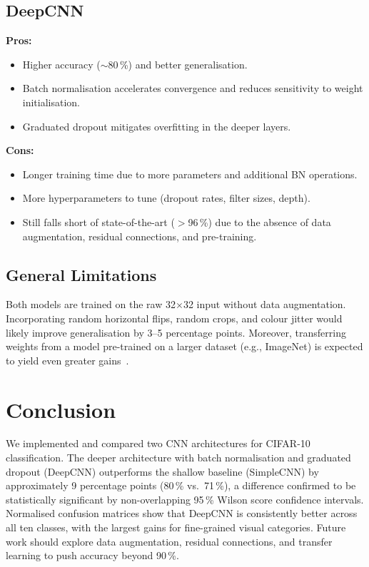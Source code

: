 \documentclass[conference]{IEEEtran}
\begin{document}
\subsection{DeepCNN}

\textbf{Pros:}
\begin{itemize}
  \item Higher accuracy ($\sim$80\,\%) and better generalisation.
  \item Batch normalisation accelerates convergence and reduces sensitivity
        to weight initialisation.
  \item Graduated dropout mitigates overfitting in the deeper layers.
\end{itemize}

\textbf{Cons:}
\begin{itemize}
  \item Longer training time due to more parameters and additional BN
        operations.
  \item More hyperparameters to tune (dropout rates, filter sizes, depth).
  \item Still falls short of state-of-the-art ($>$96\,\%) due to the absence
        of data augmentation, residual connections, and pre-training.
\end{itemize}

\subsection{General Limitations}

Both models are trained on the raw 32$\times$32 input without data
augmentation.
Incorporating random horizontal flips, random crops, and colour jitter would
likely improve generalisation by 3–5 percentage points.
Moreover, transferring weights from a model pre-trained on a larger dataset
(e.g., ImageNet) is expected to yield even greater gains~\cite{he2016deep}.

\section{Conclusion}

We implemented and compared two CNN architectures for CIFAR-10 classification.
The deeper architecture with batch normalisation and graduated dropout (DeepCNN)
outperforms the shallow baseline (SimpleCNN) by approximately 9 percentage
points (80\,\% vs.\ 71\,\%), a difference confirmed to be statistically
significant by non-overlapping 95\,\% Wilson score confidence intervals.
Normalised confusion matrices show that DeepCNN is consistently better across
all ten classes, with the largest gains for fine-grained visual categories.
Future work should explore data augmentation, residual connections, and
transfer learning to push accuracy beyond 90\,\%.
\end{document}
